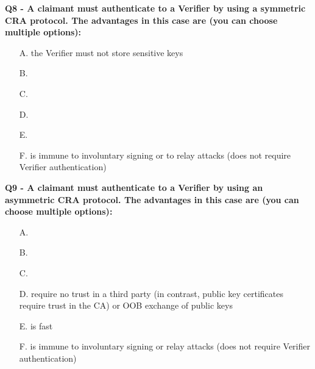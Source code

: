 \textbf{Q8 - A claimant must authenticate to a Verifier by using a symmetric CRA protocol. The advantages in this case are (you can choose multiple options):}
\begin{enumerate}
    \item[A.] the Verifier must not store sensitive keys
    \item[B.] 
    \item[C.] 
    \item[D.] 
    \item[E.] 
    \item[F.] is immune to involuntary signing or to relay attacks (does not require Verifier authentication)
\end{enumerate}

\textbf{Q9 - A claimant must authenticate to a Verifier by using an asymmetric CRA protocol. The advantages in this case are (you can choose multiple options):}
\begin{enumerate}
    \item[A.] 
    \item[B.] 
    \item[C.] 
    \item[D.] require no trust in a third party (in contrast, public key certificates require trust in the CA) or OOB exchange of public keys
    \item[E.] is fast
    \item[F.] is immune to involuntary signing or relay attacks (does not require Verifier authentication)
\end{enumerate}
